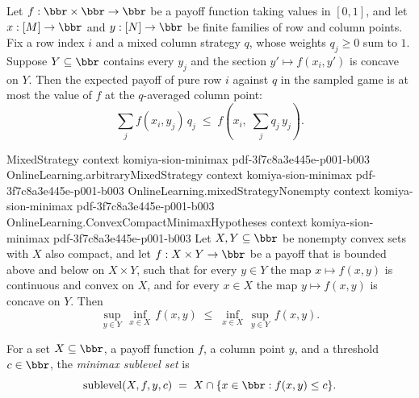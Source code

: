 \begin{lemma}
\label{OnlineLearning.sampled_pureVsPayoff_le_concave_combo}
\leanok
{}
Let $f:\bbr\times\bbr\to\bbr$ be a payoff function taking values in $[0,1]$, and let
$x:[M]\to\bbr$ and $y:[N]\to\bbr$ be finite families of row and column points. Fix a row
index $i$ and a mixed column strategy $q$, whose weights $q_j\ge 0$ sum to $1$. Suppose
$Y\subseteq\bbr$ contains every $y_j$ and the section $y'\mapsto f(x_i,y')$ is concave
on $Y$. Then the expected payoff of pure row $i$ against $q$ in the sampled game is at
most the value of $f$ at the $q$-averaged column point:
\[
  \sum_{j} f(x_i,y_j)\, q_j \;\le\; f\!\left(x_i,\; \sum_{j} q_j\, y_j\right).
\]
\end{lemma}

\begin{lemma}
\label{OnlineLearning.weak_convex_compact_minimax}
\leanok
{}
\proofstep
  {MixedStrategy}
  {context}
  {komiya-sion-minimax}
  {pdf-3f7c8a3e445e-p001-b003}
\proofstep
  {OnlineLearning.arbitraryMixedStrategy}
  {context}
  {komiya-sion-minimax}
  {pdf-3f7c8a3e445e-p001-b003}
\proofstep
  {OnlineLearning.mixedStrategyNonempty}
  {context}
  {komiya-sion-minimax}
  {pdf-3f7c8a3e445e-p001-b003}
\proofstep
  {OnlineLearning.ConvexCompactMinimaxHypotheses}
  {context}
  {komiya-sion-minimax}
  {pdf-3f7c8a3e445e-p001-b003}
Let $X, Y \subseteq \bbr$ be nonempty convex sets with $X$ also compact, and let $f : X
\times Y \to \bbr$ be a payoff that is bounded above and below on $X \times Y$, such
that for every $y \in Y$ the map $x \mapsto f(x,y)$ is continuous and convex on $X$, and
for every $x \in X$ the map $y \mapsto f(x,y)$ is concave on $Y$. Then
\[
  \sup_{y \in Y}\,\inf_{x \in X}\, f(x,y)
  \;\leq\;
  \inf_{x \in X}\,\sup_{y \in Y}\, f(x,y).
\]
\end{lemma}

\begin{definition}
\label{OnlineLearning.minimaxSublevel}
\leanok
For a set $X \subseteq \bbr$, a payoff function $f$, a column point $y$, and
a threshold $c \in \bbr$, the \emph{minimax sublevel set} is
\[
  \mathrm{sublevel}(X,f,y,c) \;=\; X \cap \{x \in \bbr : f(x,y) \leq c\}.
\]
\end{definition}

